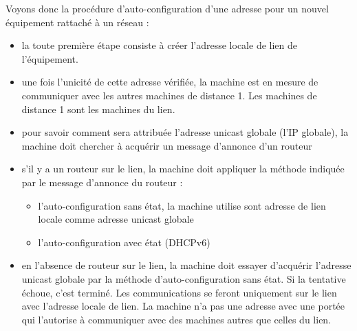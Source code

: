 Voyons donc la procédure d’auto-configuration d’une adresse pour un nouvel équipement rattaché à un réseau :
\begin{itemize}
  \item la toute première étape consiste à créer l'adresse locale de lien de l’équipement.
  \item une fois l'unicité de cette adresse vérifiée, la machine est en mesure de communiquer avec les autres machines de distance 1. Les machines de distance 1 sont les machines du lien.
  \item pour savoir comment sera attribuée l’adresse unicast globale (l’IP globale), la machine doit chercher à acquérir un message d'annonce d’un routeur
  \item s'il y a un routeur sur le lien, la machine doit appliquer la méthode indiquée par le message d'annonce du routeur :
    \begin{itemize}
      \item l'auto-configuration sans état, la machine utilise sont adresse de lien locale comme adresse unicast globale
      \item l'auto-configuration avec état (DHCPv6)
    \end{itemize}
  \item en l'absence de routeur sur le lien, la machine doit essayer d'acquérir l'adresse unicast globale par la méthode d'auto-configuration sans état. Si la tentative échoue, c'est terminé. Les communications se feront uniquement sur le lien avec l'adresse locale de lien. La machine n'a pas une adresse avec une portée qui l'autorise à communiquer avec des machines autres que celles du lien.
\end{itemize}

